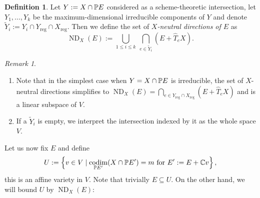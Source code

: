 \documentclass[a4paper,10pt]{article}
\def\reg{\text{reg}}
\def\set#1{\left\{#1\right\}}
\DeclareMathOperator{\codim}{codim}
\DeclareMathOperator{\ND}{ND}
\theoremstyle{definition}
\newtheorem{definition}[theorem]{Definition}
\theoremstyle{remark}
\newtheorem*{remark}{Remark}
\begin{document}
\begin{definition}
    \label{def:NDX}
    Let $Y:=X\cap\pe E$ considered as a scheme-theoretic intersection, let $Y_1,\dots,Y_k$ be the maximum-dimensional irreducible components of $Y$ and denote $\tilde Y_i := Y_i\cap Y_\reg\cap X_\reg$.
    Then we define the set of \emph{$X$-neutral directions of $E$} as
    \[
        \ND_X(E) := \bigcup_{1\leq i\leq k}\ \bigcap_{e\in \tilde Y_i}(E+\hat T_{e}X).
    \]
\end{definition}
\begin{remark}
    \begin{enumerate}
    \item Note that in the simplest case when $Y=X\cap \pe E$ is irreducible, the set of $X$-neutral directions simplifies to
    $\ND_X(E) = \bigcap_{e\in Y_\reg\cap X_\reg} (E+\hat T_e X)$ and is a linear subspace of $V$.
    \item If a $\tilde Y_i$ is empty, we interpret the intersection indexed by it as the whole space $V$.
    \end{enumerate}
\end{remark}


Let us now fix $E$ and define
\[
    U := \set{v\in V\mid \text{$\codim_{\pe E'}(X\cap \pe E')=m$ for $E':= E+\ce v$}},
\]
this is an affine variety in $V$. Note that trivially $E\subseteq U$. On the other hand, we will bound $U$ by $\ND_X(E)$:
\end{document}
